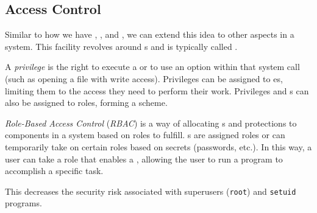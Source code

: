 \subsection{Access Control}\label{subsec:Access_Control}
Similar to how we have , , and , we can extend this idea to other aspects in a system.
This facility revolves around s and is typically called .

\begin{definition}[Privilege]\label{def:Privilege}
  A \emph{privilege} is the right to execute a  or to use an option within that system call (such as opening a file with write access).
  Privileges can be assigned to es, limiting them to the access they need to perform their work.
  Privileges and s can also be assigned to roles, forming a  scheme.
\end{definition}

\begin{definition}\label{def:Role_Based_Access_Control}
  \emph{Role-Based Access Control} (\emph{RBAC}) is a way of allocating s and protections to components in a system based on roles to fulfill.
  s are assigned roles or can temporarily take on certain roles based on secrets (passwords, etc.).
  In this way, a user can take a role that enables a , allowing the user to run a program to accomplish a specific task.
\end{definition}

This decreases the security risk associated with superusers (\texttt{root}) and \texttt{setuid} programs.

